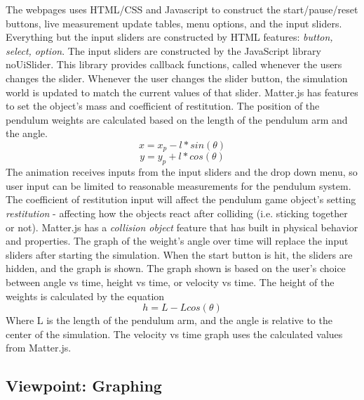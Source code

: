 \documentclass[onecolumn, draftclsnofoot,10pt, compsoc]{IEEEtran}
\begin{document}
The webpages uses HTML/CSS and Javascript to construct the start/pause/reset buttons, live measurement update tables, menu options, and the input sliders. Everything but the input sliders are constructed by HTML features: \textit{button, select, option}. 
The input sliders are constructed by the JavaScript library noUiSlider. This library provides callback functions, called whenever the users changes the slider. Whenever the user changes the slider button, the simulation world is updated to match the current values of that slider. Matter.js has features to set the object's mass and coefficient of restitution. The position of the pendulum weights are calculated based on the length of the pendulum arm and the angle. 
\begin{equation}
    x = x_p - l*sin(\theta)
\end{equation}
\begin{equation}
    y = y_p + l*cos(\theta)
\end{equation}
The animation receives inputs from the input sliders and the drop down menu, so user input can be limited to reasonable measurements for the pendulum system. The coefficient of restitution input will affect the pendulum game object's setting \textit{restitution} - affecting how the objects react after colliding (i.e. sticking together or not). Matter.js has a \textit{collision object} feature that has built in physical behavior and properties. 
\newline The graph of the weight's angle over time will replace the input sliders after starting the simulation. When the start button is hit, the sliders are hidden, and the graph is shown. The graph shown is based on the user's choice between angle vs time, height vs time, or velocity vs time.
The height of the weights is calculated by the equation 
\begin{equation}
    h = L - Lcos(\theta)
\end{equation}
Where L is the length of the pendulum arm, and the angle is relative to the center of the simulation.
The velocity vs time graph uses the calculated values from Matter.js. 



\subsection{Viewpoint: Graphing}
\end{document}
